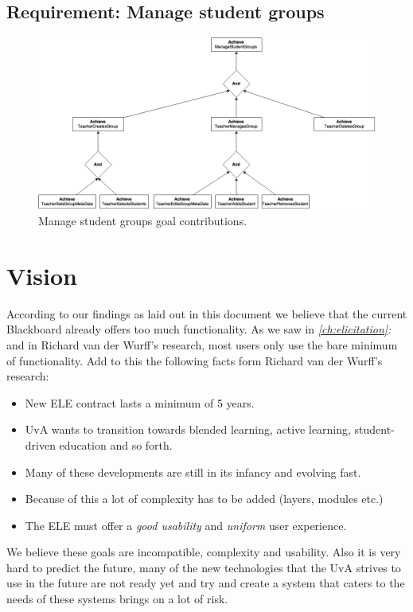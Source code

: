 \clearpage
\subsection{Requirement: Manage student groups}
\begin{figure}[h!]
	\centering
	\includegraphics[width=1\linewidth]{images/ManageStudentGroups.png}
	\caption{Manage student groups goal contributions.}
	\label{fig:goal_manage_student_groups}
\end{figure}

\clearpage
\section{Vision}
According to our findings as laid out in this document we believe that the current Blackboard already offers too much functionality. As we saw in \emph{\ref{ch:elicitation}: } and in Richard van der Wurff's research, most users only use the bare minimum of functionality. Add to this the following facts form Richard van der Wurff's research:
\begin{itemize}
	\item New ELE contract lasts a minimum of 5 years.
	\item UvA wants to transition towards blended learning, active learning, student-driven education and so forth.
	\item Many of these developments are still in its infancy and evolving fast.
	\item Because of this a lot of complexity has to be added (layers, modules etc.)
	\item The ELE must offer a \emph{good usability} and \emph{uniform} user experience.
\end{itemize}

We believe these goals are incompatible, complexity and usability. Also it is very hard to predict the future, many of the new technologies that the UvA strives to use in the future are not ready yet and try and create a system that caters to the needs of these systems brings on a lot of risk.

